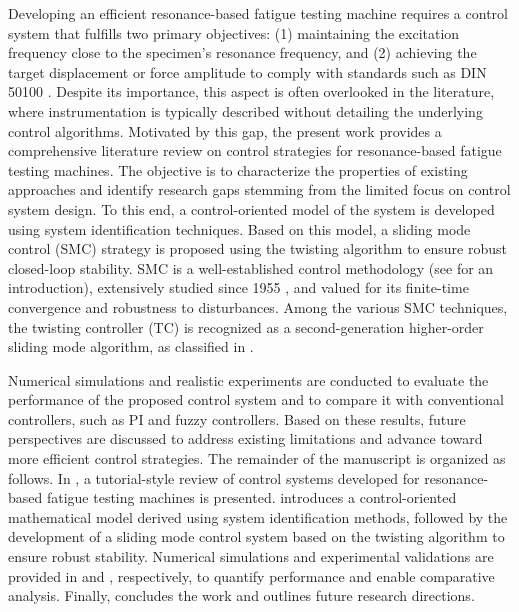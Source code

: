 \documentclass[lettersize,journal]{IEEEtran}
\begin{document}
Developing an efficient resonance-based fatigue testing machine requires a control system that fulfills two primary objectives: (1) maintaining the excitation frequency close to the specimen’s resonance frequency, and (2) achieving the target displacement or force amplitude to comply with standards such as DIN 50100 \cite{DIN_standard}. Despite its importance, this aspect is often overlooked in the literature, where instrumentation is typically described without detailing the underlying control algorithms. Motivated by this gap, the present work provides a comprehensive literature review on control strategies for resonance-based fatigue testing machines. The objective is to characterize the properties of existing approaches and identify research gaps stemming from the limited focus on control system design. To this end, a control-oriented model of the system is developed using system identification techniques. Based on this model, a sliding mode control (SMC) strategy is proposed using the twisting algorithm to ensure robust closed-loop stability. SMC is a well-established control methodology (see \cite{Slotine1991} for an introduction), extensively studied since 1955 \cite{Utkin1955}, and valued for its finite-time convergence and robustness to disturbances. Among the various SMC techniques, the twisting controller (TC) \cite{UTKIN2020_higher_order, Orlov_twisting, Utkin_twisting, POLYAKOV_twisting, Santiesteban_twisting, TORRESGONZALEZ2017_twisting, Santiesteban_twisting} is recognized as a second-generation higher-order sliding mode algorithm, as classified in \cite{Fridman2015}.


Numerical simulations and realistic experiments are conducted to evaluate the performance of the proposed control system and to compare it with conventional controllers, such as PI and fuzzy controllers. Based on these results, future perspectives are discussed to address existing limitations and advance toward more efficient control strategies. The remainder of the manuscript is organized as follows. In , a tutorial-style review of control systems developed for resonance-based fatigue testing machines is presented.  introduces a control-oriented mathematical model derived using system identification methods, followed by the development of a sliding mode control system based on the twisting algorithm to ensure robust stability. Numerical simulations and experimental validations are provided in  and , respectively, to quantify performance and enable comparative analysis. Finally,  concludes the work and outlines future research directions.
\end{document}
